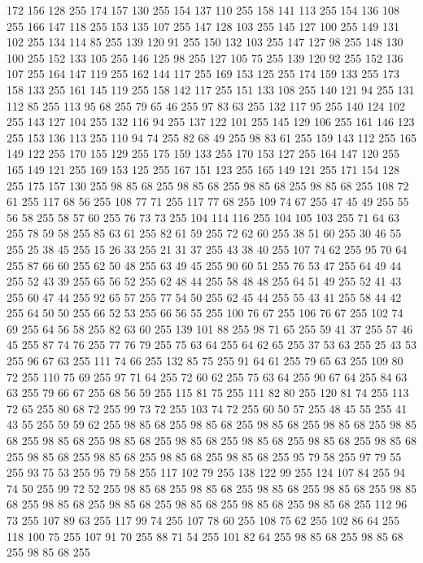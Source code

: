 172 156 128 255 174 157 130 255 154 137 110 255 158 141 113 255 154 136 108 255 166 147 118 255 153 135 107 255 147 128 103 255 145 127 100 255 149 131 102 255 134 114 85 255 139 120 91 255 150 132 103 255 147 127 98 255 148 130 100 255 152 133 105 255 146 125 98 255 127 105 75 255 139 120 92 255 152 136 107 255 164 147 119 255 162 144 117 255 169 153 125 255 174 159 133 255 173 158 133 255 161 145 119 255 158 142 117 255 151 133 108 255 140 121 94 255 131 112 85 255 113 95 68 255 79 65 46 255 97 83 63 255 132 117 95 255 140 124 102 255 143 127 104 255 132 116 94 255 137 122 101 255 145 129 106 255 161 146 123 255 153 136 113 255 110 94 74 255 82 68 49 255 98 83 61 255 159 143 112 255 165 149 122 255 170 155 129 255 175 159 133 255 170 153 127 255 164 147 120 255 165 149 121 255 169 153 125 255 167 151 123 255 165 149 121 255 171 154 128 255 175 157 130 255 98 85 68 255 98 85 68 255 98 85 68 255 98 85 68 255 108 72 61 255 117 68 56 255 108 77 71 255 117 77 68 255
109 74 67 255 47 45 49 255 55 56 58 255 58 57 60 255 76 73 73 255 104 114 116 255 104 105 103 255 71 64 63 255 78 59 58 255 85 63 61 255 82 61 59 255 72 62 60 255 38 51 60 255 30 46 55 255 25 38 45 255 15 26 33 255 21 31 37 255 43 38 40 255 107 74 62 255 95 70 64 255 87 66 60 255 62 50 48 255 63 49 45 255 90 60 51 255 76 53 47 255 64 49 44 255 52 43 39 255 65 56 52 255 62 48 44 255 58 48 48 255 64 51 49 255 52 41 43 255 60 47 44 255 92 65 57 255 77 54 50 255 62 45 44 255 55 43 41 255 58 44 42 255 64 50 50 255 66 52 53 255 66 56 55 255 100 76 67 255 106 76 67 255 102 74 69 255 64 56 58 255 82 63 60 255 139 101 88 255 98 71 65 255 59 41 37 255 57 46 45 255 87 74 76 255 77 76 79 255 75 63 64 255 64 62 65 255 37 53 63 255 25 43 53 255 96 67 63 255 111 74 66 255 132 85 75 255 91 64 61 255 79 65 63 255 109 80 72 255 110 75 69 255 97 71 64 255
72 60 62 255 75 63 64 255 90 67 64 255 84 63 63 255 79 66 67 255 68 56 59 255 115 81 75 255 111 82 80 255 120 81 74 255 113 72 65 255 80 68 72 255 99 73 72 255 103 74 72 255 60 50 57 255 48 45 55 255 41 43 55 255 59 59 62 255 98 85 68 255 98 85 68 255 98 85 68 255 98 85 68 255 98 85 68 255 98 85 68 255 98 85 68 255 98 85 68 255 98 85 68 255 98 85 68 255 98 85 68 255 98 85 68 255 98 85 68 255 98 85 68 255 98 85 68 255 95 79 58 255 97 79 55 255 93 75 53 255 95 79 58 255 117 102 79 255 138 122 99 255 124 107 84 255 94 74 50 255 99 72 52 255 98 85 68 255 98 85 68 255 98 85 68 255 98 85 68 255 98 85 68 255 98 85 68 255 98 85 68 255 98 85 68 255 98 85 68 255 98 85 68 255 112 96 73 255 107 89 63 255 117 99 74 255 107 78 60 255 108 75 62 255 102 86 64 255 118 100 75 255 107 91 70 255 88 71 54 255 101 82 64 255 98 85 68 255 98 85 68 255 98 85 68 255
